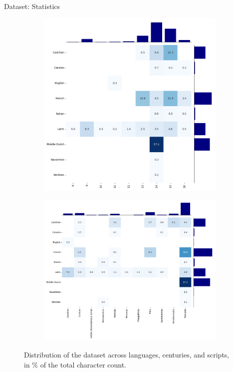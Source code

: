 \documentclass[aspectratio=169]{beamer}
\begin{document}
\begin{frame}{Dataset: Statistics}
    
    \begin{figure}[h]
      \begin{subfigure}[T]{0.40\textwidth}
        \includegraphics[width=\linewidth]{cv-for-ch/images/language.century.png}
      \end{subfigure}
      \hfill
      \begin{subfigure}[T]{0.40\textwidth}
        \includegraphics[width=\linewidth]{cv-for-ch/images/language.script.png}
      \end{subfigure}
      \caption{Distribution of the dataset across languages, centuries, and scripts, in \% of the total character count.}
      \label{fig:lang-cent-script}
    \end{figure}
    
\end{frame}
\end{document}
